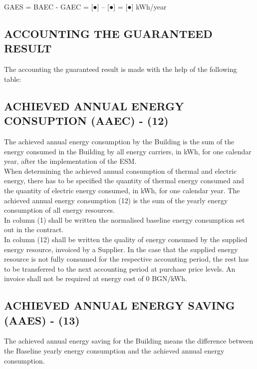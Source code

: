 GAES = BAEC {-} GAEC = [●] – [●] = [●] kWh/year

\subsection{ACCOUNTING THE GUARANTEED RESULT}
The accounting the guaranteed result is made with the help of the
following table:


\begin{center}
\end{center}

\subsection{ACHIEVED ANNUAL ENERGY CONSUPTION (AAEC) {-} (12)}
The achieved annual energy consumption by the Building is the sum of the energy consumed in the Building by all energy carriers, in kWh, for one calendar year, after the implementation of the ESM. \\

When determining the achieved annual consumption of thermal and electric energy, there has to be specified the quantity of thermal energy consumed and the quantity of electric energy consumed, in kWh, for one calendar year. The achieved annual energy consumption (12) is the sum of the yearly energy consumption of all energy resources. \\

In column (1) shall be written the normalised baseline energy consumption set out in the contract. \\

In column (12) shall be written the quality of energy consumed by the supplied energy resource, invoiced by a Supplier. In the case that the supplied energy resource is not fully consumed for the respective accounting period, the rest has to be transferred to the next accounting period at purchase price levels. An invoice shall not be required at energy cost of 0 BGN/kWh. \\

\subsection{ACHIEVED ANNUAL ENERGY SAVING (AAES) {-} (13)}
The achieved annual energy saving for the Building means the
difference between the Baseline yearly energy consumption and the
achieved annual energy consumption.

